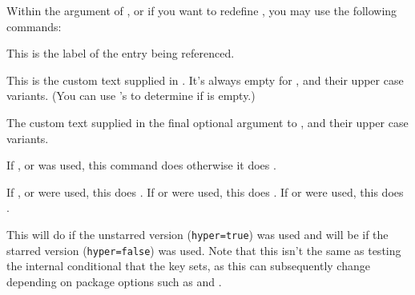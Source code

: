 \documentclass[report,inlinetitle]{nlctdoc}
\newcommand*{\gloskey}[2][newglossaryentry]{\csopt{#1}{#2}}
\begin{document}
Within the  argument of , or if you
want to redefine , you may use the following
commands:

\begin{definition}[\DescribeMacro{\glslabel}]
\end{definition}
This is the label of the entry being referenced.

\begin{definition}[\DescribeMacro{\glscustomtext}]
\end{definition}
This is the custom text supplied in . It's always empty
for ,  and their upper case variants. (You can 
use 's  to determine if
 is empty.) 

\begin{definition}[\DescribeMacro{\glsinsert}]
\end{definition}
The custom text supplied in the final optional argument to ,
 and their upper case variants.

\begin{definition}[\DescribeMacro{\glsifplural}]
\end{definition}
If ,  or  was used, this command does 
 otherwise it does .

\begin{definition}[\DescribeMacro{\glscapscase}]
\end{definition}
If ,  or  were used, this does . If  or  were used, this does . If  or  were used, this does .

\begin{definition}[\DescribeMacro\glsifhyper]
\end{definition}
This will do  if the unstarred version
(\texttt{hyper=true}) was used and will be 
 if the starred version
(\texttt{hyper=false}) was used. Note that this
isn't the same as testing the internal conditional that the
\gloskey[glslink]{hyper} key sets, as this can subsequently change
depending on package options such as  and 
.
\end{document}
